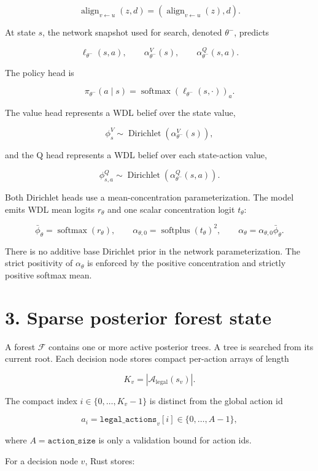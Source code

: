 \documentclass[11pt]{article}
\newcommand{\Dir}{\operatorname{Dirichlet}}
\newcommand{\softmax}{\operatorname{softmax}}
\newcommand{\softplus}{\operatorname{softplus}}
\newcommand{\Forest}{\mathcal{F}}
\newcommand{\Legal}{\mathcal{A}_{\mathrm{legal}}}
\newcommand{\Align}{\operatorname{align}}
\begin{document}
\[
\Align_{v\leftarrow u}(z,d)=
\left(\Align_{v\leftarrow u}(z),d\right).
\]

At state \(s\), the network snapshot used for search, denoted \(\theta^-\),
predicts

\[
\ell_{\theta^-}(s,a),
\qquad
\alpha_{\theta^-}^V(s),
\qquad
\alpha_{\theta^-}^Q(s,a).
\]

The policy head is

\[
\pi_{\theta^-}(a\mid s)
=
\softmax(\ell_{\theta^-}(s,\cdot))_a.
\]

The value head represents a WDL belief over the state value,

\[
\phi_s^V\sim\Dir(\alpha_{\theta^-}^V(s)),
\]

and the Q head represents a WDL belief over each state-action value,

\[
\phi_{s,a}^Q\sim\Dir(\alpha_{\theta^-}^Q(s,a)).
\]

Both Dirichlet heads use a mean-concentration parameterization. The model emits
WDL mean logits \(r_\theta\) and one scalar concentration logit \(t_\theta\):

\[
\bar\phi_\theta=\softmax(r_\theta),
\qquad
\alpha_{\theta,0}=\softplus(t_\theta)^2,
\qquad
\alpha_\theta=\alpha_{\theta,0}\bar\phi_\theta.
\]

There is no additive base Dirichlet prior in the network parameterization. The
strict positivity of \(\alpha_\theta\) is enforced by the positive concentration
and strictly positive softmax mean.

\section*{3. Sparse posterior forest state}

A forest \(\Forest\) contains one or more active posterior trees. A tree is
searched from its current root. Each decision node stores compact per-action
arrays of length

\[
K_v=|\Legal(s_v)|.
\]

The compact index \(i\in\{0,\ldots,K_v-1\}\) is distinct from the global action
id

\[
a_i=\texttt{legal\_actions}_v[i]
\in\{0,\ldots,A-1\},
\]

where \(A=\texttt{action\_size}\) is only a validation bound for action ids.

For a decision node \(v\), Rust stores:
\end{document}
